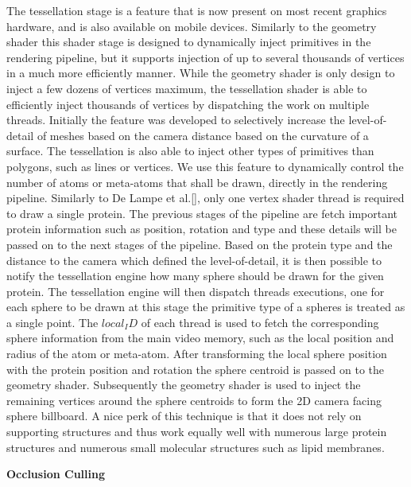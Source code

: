 The tessellation stage is a feature that is now present on most recent graphics hardware, and is also available on mobile devices.
Similarly to the geometry shader this shader stage is designed to dynamically inject primitives in the rendering pipeline, but it supports injection of up to several thousands of vertices in a much more efficiently manner.
While the geometry shader is only design to inject a few dozens of vertices maximum, the tessellation shader is able to efficiently inject thousands of vertices by dispatching the work on multiple threads.
Initially the feature was developed to selectively increase the level-of-detail of meshes based on the camera distance based on the curvature of a surface.
The tessellation is also able to inject other types of primitives than polygons, such as lines or vertices.
We use this feature to dynamically control the number of atoms or meta-atoms that shall be drawn, directly in the rendering pipeline.
Similarly to De Lampe et al.[], only one vertex shader thread is required to draw a single protein.
The previous stages of the pipeline are fetch important protein information such as position, rotation and type and these details will be passed on to the next stages of the pipeline.
Based on the protein type and the distance to the camera which defined the level-of-detail, it is then possible to notify the tessellation engine how many sphere should be drawn for the given protein.
The tessellation engine will then dispatch threads executions, one for each sphere to be drawn at this stage the primitive type of a spheres is treated as a single point.
The $local_ID$ of each thread is used to fetch the corresponding sphere information from the main video memory, such as the local position and radius of the atom or meta-atom.
After transforming the local sphere position with the protein position and rotation the sphere centroid is passed on to the geometry shader.
Subsequently the geometry shader is used to inject the remaining vertices around the sphere centroids to form the 2D camera facing sphere billboard.
A nice perk of this technique is that it does not rely on supporting structures and thus work equally well with numerous large protein structures and numerous small molecular structures such as lipid membranes.

\textbf{Occlusion Culling}

